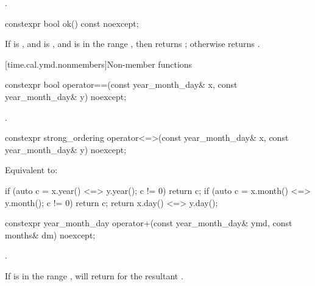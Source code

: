 \begin{itemdescr}
\pnum
\returns
{}.
\end{itemdescr}

%
\begin{itemdecl}
constexpr bool ok() const noexcept;
\end{itemdecl}

\begin{itemdescr}
\pnum
\returns
If  is ,
and  is ,
and  is in the range ,
then returns ; otherwise returns .
\end{itemdescr}

[time.cal.ymd.nonmembers]{Non-member functions}

%
\begin{itemdecl}
constexpr bool operator==(const year_month_day& x, const year_month_day& y) noexcept;
\end{itemdecl}

\begin{itemdescr}
\pnum
\returns
{}.
\end{itemdescr}

%
\begin{itemdecl}
constexpr strong_ordering operator<=>(const year_month_day& x, const year_month_day& y) noexcept;
\end{itemdecl}

\begin{itemdescr}
\pnum
\effects
Equivalent to:
\begin{codeblock}
if (auto c = x.year() <=> y.year(); c != 0) return c;
if (auto c = x.month() <=> y.month(); c != 0) return c;
return x.day() <=> y.day();
\end{codeblock}
\end{itemdescr}

%
\begin{itemdecl}
constexpr year_month_day operator+(const year_month_day& ymd, const months& dm) noexcept;
\end{itemdecl}

\begin{itemdescr}
\pnum
\returns
{}.

\pnum
\begin{note}
If  is in the range ,
 will return  for
the resultant .
\end{note}
\end{itemdescr}

